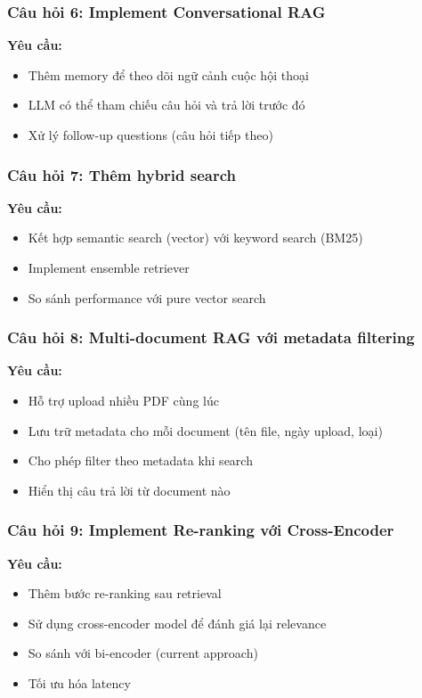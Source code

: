 \documentclass[a4paper]{article}
\begin{document}
\subsubsection{Câu hỏi 6: Implement Conversational RAG} 
\textbf{Yêu cầu:}
\begin{itemize}
    \item Thêm memory để theo dõi ngữ cảnh cuộc hội thoại
    \item LLM có thể tham chiếu câu hỏi và trả lời trước đó
    \item Xử lý follow-up questions (câu hỏi tiếp theo)
\end{itemize}
\subsubsection{Câu hỏi 7: Thêm hybrid search}
\textbf{Yêu cầu:}
\begin{itemize}
    \item Kết hợp semantic search (vector) với keyword search (BM25)
    \item Implement ensemble retriever
    \item So sánh performance với pure vector search
\end{itemize}
\subsubsection{Câu hỏi 8: Multi-document RAG với metadata filtering} 
\textbf{Yêu cầu:}
\begin{itemize}
    \item Hỗ trợ upload nhiều PDF cùng lúc
    \item Lưu trữ metadata cho mỗi document (tên file, ngày upload, loại)
    \item Cho phép filter theo metadata khi search
    \item Hiển thị câu trả lời từ document nào
\end{itemize}
\subsubsection{Câu hỏi 9: Implement Re-ranking với Cross-Encoder}
\textbf{Yêu cầu:}
\begin{itemize}
    \item Thêm bước re-ranking sau retrieval
    \item Sử dụng cross-encoder model để đánh giá lại relevance
    \item So sánh với bi-encoder (current approach)
    \item Tối ưu hóa latency
\end{itemize}
\end{document}
